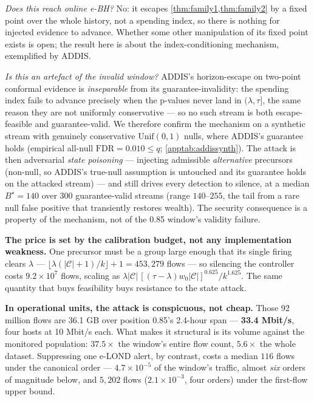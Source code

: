 \documentclass[conference]{IEEEtran}
\newcommand{\Cal}{\mathcal{C}}
\newcommand{\nCal}{\lvert\Cal\rvert}
\newcommand{\FDR}{\mathrm{FDR}}
\begin{document}
\emph{Does this reach online e-BH?} No: it escapes \cref{thm:family1,thm:family2} by a fixed point over
the whole history, not a spending index, so there is nothing for injected evidence to advance. Whether
some other manipulation of its fixed point exists is open; the result here is about the
index-conditioning mechanism, exemplified by ADDIS.

\emph{Is this an artefact of the invalid window?} ADDIS's horizon-escape on two-point conformal
evidence is \emph{inseparable} from its guarantee-invalidity: the spending index fails to advance
precisely when the p-values never land in $(\lambda,\tau]$, the same reason they are not uniformly
conservative --- so no such stream is both escape-feasible and guarantee-valid. We therefore confirm
the mechanism on a synthetic stream with genuinely conservative $\mathrm{Unif}(0,1)$ nulls, where
ADDIS's guarantee holds (empirical all-null $\FDR = 0.010 \le q$; \cref{apptab:addissynth}). The attack is then adversarial \emph{state poisoning} --- injecting
admissible \emph{alternative} precursors (non-null, so ADDIS's true-null assumption is untouched and its
guarantee holds on the attacked stream) --- and still drives every detection to silence, at a median
$B^{\star}=140$ over 300 guarantee-valid streams (range $140$--$255$, the tail from a rare null false
positive that transiently restores wealth). The security consequence is a property of the mechanism,
not of the 0.85 window's validity failure.

\textbf{The price is set by the calibration budget, not any implementation weakness.} One precursor
must be a group large enough that its single firing clears $\lambda$ ---
$\lfloor\lambda(\nCal+1)/k\rfloor + 1 = 453{,}279$ flows --- so silencing the controller costs
$9.2\times10^{7}$ flows, scaling as $\lambda\nCal\,[(\tau-\lambda)w_0\nCal]^{0.625}/k^{1.625}$. The same
quantity that buys feasibility buys resistance to the state attack.

\textbf{In operational units, the attack is conspicuous, not cheap.} Those 92 million flows are 36.1 GB
over position 0.85's 2.4-hour span --- \textbf{33.4 Mbit/s}, four hosts at 10 Mbit/s each. What makes it
structural is its volume against the monitored population: $37.5\times$ the window's entire flow count,
$5.6\times$ the whole dataset. Suppressing one e-LOND alert, by contrast, costs a median $116$ flows
under the canonical order --- $4.7\times10^{-5}$ of the window's traffic, almost \emph{six} orders of
magnitude below, and $5{,}202$ flows ($2.1\times10^{-3}$, four orders) under the first-flow upper
bound.
\end{document}
